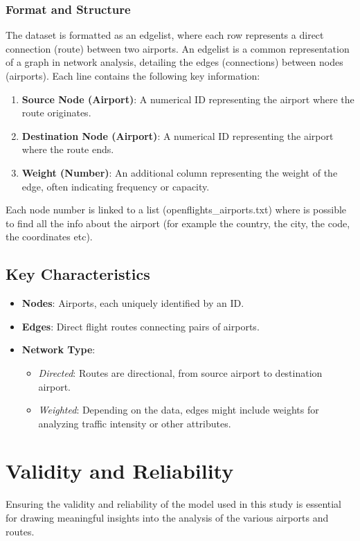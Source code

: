 \documentclass[12pt]{article}
\begin{document}
\subsubsection{Format and Structure}
The dataset is formatted as an edgelist, where each row represents a direct connection (route) between two airports. An edgelist is a common representation of a graph in network analysis, detailing the edges (connections) between nodes (airports). Each line contains the following key information:
\begin{enumerate}
    \item \textbf{Source Node (Airport)}: A numerical ID representing the airport where the route originates.
    \item \textbf{Destination Node (Airport)}: A numerical ID representing the airport where the route ends.
    \item \textbf{Weight (Number)}: An additional column representing the weight of the edge, often indicating frequency or capacity.
\end{enumerate}
Each node number is linked to a list (openflights\_airports.txt) where is possible to find all the info about the airport (for example the country, the city, the code, the coordinates etc).

\subsection{Key Characteristics}
\begin{itemize}
    \item \textbf{Nodes}: Airports, each uniquely identified by an ID.
    \item \textbf{Edges}: Direct flight routes connecting pairs of airports.
    \item \textbf{Network Type}:
    \begin{itemize}
        \item \textit{Directed}: Routes are directional, from source airport to destination airport.
        \item \textit{Weighted}: Depending on the data, edges might include weights for analyzing traffic intensity or other attributes.
    \end{itemize}
\end{itemize}

\section{Validity and Reliability}
Ensuring the validity and reliability of the model used in this study is essential for drawing
meaningful insights into the analysis of the various airports and routes.
\end{document}
